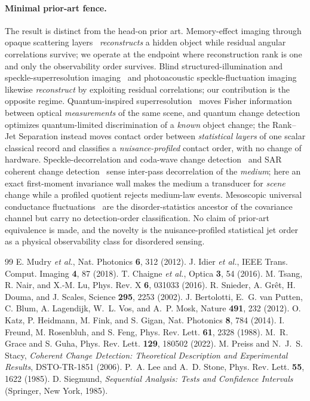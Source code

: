 \documentclass[aps,prl,onecolumn,notitlepage,nofootinbib,superscriptaddress]{revtex4-2}
\begin{document}
\paragraph*{Minimal prior-art fence.}
The result is distinct from the head-on prior art. Memory-effect imaging through
opaque scattering layers~\cite{s_Bertolotti,s_Katz,s_Freund} \emph{reconstructs}
a hidden object while residual angular correlations survive; we operate at the
endpoint where reconstruction rank is one and only the observability order
survives. Blind structured-illumination and speckle-superresolution
imaging~\cite{s_Mudry,s_Idier} and photoacoustic speckle-fluctuation
imaging~\cite{s_Chaigne} likewise \emph{reconstruct} by exploiting residual
correlations; our contribution is the opposite regime. Quantum-inspired
superresolution~\cite{s_Tsang} moves Fisher information between optical
\emph{measurements} of the same scene, and quantum change
detection~\cite{s_GraceGuha} optimizes quantum-limited discrimination of a
\emph{known} object change; the Rank--Jet Separation instead moves contact order
between \emph{statistical layers} of one scalar classical record and classifies a
\emph{nuisance-profiled} contact order, with no change of hardware.
Speckle-decorrelation and coda-wave change detection~\cite{s_Snieder} and SAR
coherent change detection~\cite{s_SAR_CCD} sense inter-pass decorrelation of the
\emph{medium}; here an exact first-moment invariance wall makes the medium a
transducer for \emph{scene} change while a profiled quotient rejects medium-law
events. Mesoscopic universal conductance fluctuations~\cite{s_LeeStone} are the
disorder-statistics ancestor of the covariance channel but carry no
detection-order classification. No claim of prior-art equivalence is made, and the
novelty is the nuisance-profiled statistical jet order as a physical observability
class for disordered sensing.

\begin{thebibliography}{99}
 E. Mudry \textit{et al.}, Nat. Photonics \textbf{6}, 312 (2012).
 J. Idier \textit{et al.}, IEEE Trans. Comput. Imaging \textbf{4}, 87 (2018).
 T. Chaigne \textit{et al.}, Optica \textbf{3}, 54 (2016).
 M. Tsang, R. Nair, and X.-M. Lu, Phys. Rev. X \textbf{6}, 031033 (2016).
 R. Snieder, A. Gr\^et, H. Douma, and J. Scales, Science \textbf{295}, 2253 (2002).
 J. Bertolotti, E.~G. van Putten, C. Blum, A. Lagendijk, W.~L. Vos, and A.~P. Mosk, Nature \textbf{491}, 232 (2012).
 O. Katz, P. Heidmann, M. Fink, and S. Gigan, Nat. Photonics \textbf{8}, 784 (2014).
 I. Freund, M. Rosenbluh, and S. Feng, Phys. Rev. Lett. \textbf{61}, 2328 (1988).
 M.~R. Grace and S. Guha, Phys. Rev. Lett. \textbf{129}, 180502 (2022).
 M. Preiss and N.~J.~S. Stacy, \textit{Coherent Change Detection: Theoretical Description and Experimental Results}, DSTO-TR-1851 (2006).
 P.~A. Lee and A.~D. Stone, Phys. Rev. Lett. \textbf{55}, 1622 (1985).
 D. Siegmund, \textit{Sequential Analysis: Tests and Confidence Intervals} (Springer, New York, 1985).
\end{thebibliography}
\end{document}
